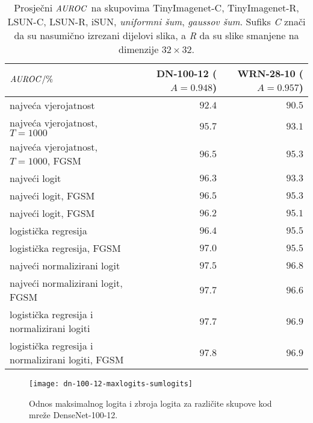 \documentclass{beamer}
\begin{document}
\begin{frame}{}	
\begin{table}
	\centering\footnotesize
	\begin{tabular}{l|rr}
		\toprule
		$\mathit{AUROC}/\%$ & \makecell[l]{DN-100-12\\ ($A=0.948$)} & \makecell[l]{WRN-28-10\\ ($A=0.957$)} \\
		\midrule
		najveća vjerojatnost & $92.4$ & $90.5$ \\
		najveća vjerojatnost, $T=1000$ & $95.7$ & $93.1$ \\
		najveća vjerojatnost, $T=1000$, FGSM & $96.5$ & $95.3$ \\
		najveći logit & $96.3$ & $93.3$ \\
		najveći logit, FGSM & $96.5$ & $95.3$ \\
		\midrule
		najveći logit, FGSM & $96.2$ & $95.1$ \\
		logistička regresija & $96.4$ & $95.5$ \\
		logistička regresija, FGSM & $97.0$ & $95.5$ \\
		najveći normalizirani logit & $97.5$ & $96.8$ \\
		najveći normalizirani logit, FGSM & $97.7$ & $96.6$ \\
		logistička regresija i normalizirani logiti & $97.7$ & $96.9$ \\
		logistička regresija i normalizirani logiti, FGSM & $97.8$ & $96.9$ \\
		\bottomrule
	\end{tabular}
	\caption{Prosječni $\mathit{AUROC}$ na skupovima TinyImagenet-C, TinyImagenet-R, LSUN-C, LSUN-R, iSUN, \textit{uniformni šum}, \textit{gaussov šum}. Sufiks \textit{C} znači da su nasumično izrezani dijelovi slika, a \textit{R} da su slike smanjene na dimenzije $32\times32$.}
\end{table}
\end{frame}

\begin{frame}{}
\begin{figure}
	\centering
	\texttt{[image: dn-100-12-maxlogits-sumlogits]}
	\caption{Odnos maksimalnog logita i zbroja logita za različite skupove kod mreže DenseNet-100-12.}
	\label{fig:dn-100-12-maxlogits-sumlogits}
\end{figure}
\end{frame}
\end{document}
